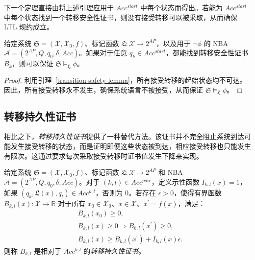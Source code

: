 下一个定理直接由将上述引理应用于 $Acc^{start}$ 中每个状态而得出。若能为 $Acc^{start}$ 中每个状态找到一个转移安全性证书，则没有接受转移可以被采取，从而确保 LTL 规约成立。

\begin{theorem}
  \label{transition-safety-LTL}
  给定系统 $\mathfrak{S} = (\mathcal{X}, \mathcal{X}_0, f)$、标记函数 $\mathfrak{L}:\mathcal{X} \rightarrow 2^{AP}$，以及用于 $\neg\phi$ 的 NBA $\mathcal{A} = (2^{AP}, Q, q_0, \delta, Acc)$。如果对于任意 $q_k \in Acc^{start}$，都能找到转移安全性证书 $B_k$，则可以保证 $\mathfrak{S} \models_{\mathfrak{L}} \phi$。
\end{theorem}

\begin{proof}
利用引理~\ref{transition-safety-lemma}，所有接受转移的起始状态均不可达。因此，所有接受转移永不发生，确保系统语言不被接受，从而保证 $\mathfrak{S} \models_{\mathfrak{L}} \phi$。
\end{proof}

\subsection{转移持久性证书}
相比之下，\emph{转移持久性证书}提供了一种替代方法。该证书并不完全阻止系统到达可能发生接受转移的状态，而是证明即便这些状态被到达，相应接受转移也只能发生有限次。这通过要求每次采取接受转移时证书值发生下降来实现。

\begin{definition}[转移持久性证书]
  \label{transition-persistence-certificate-definition}
  给定系统 $\mathfrak{S} = (\mathcal{X}, \mathcal{X}_0, f)$、标记函数 $\mathfrak{L}:\mathcal{X} \rightarrow 2^{AP}$ 和 NBA $\mathcal{A} = (2^{AP}, Q, q_0, \delta, Acc)$。对于 $(k, l) \in Acc^{pair}$，定义示性函数 $I_{k,l}(x) = 1$，如果 $(q_k, \mathfrak{L}(x), q_l) \in Acc^{k,l}$，否则为 $0$。若存在 $\epsilon > 0$，使得有界函数 $B_{k, l}(x): \mathcal{X} \rightarrow \mathbb{R}$ 对于所有 $x_0 \in \mathcal{X}_0$、$x \in \mathcal{X}$、$x^{\prime} = f(x)$，满足：
  \begin{align}
    &B_{k, l}(x_0) \geq 0, \label{btpc1} \\
    &B_{k, l}(x) \geq 0 \Rightarrow B_{k, l}(x^{\prime}) \geq 0, \label{btpc2} \\
    &B_{k, l}(x) \geq B_{k, l}(x^{\prime}) + I_{k,l}(x)\epsilon. \label{btpc3}
  \end{align}
  则称 $B_{k,l}$ 是相对于 $Acc^{k,l}$ 的\emph{转移持久性证书}。
\end{definition}

